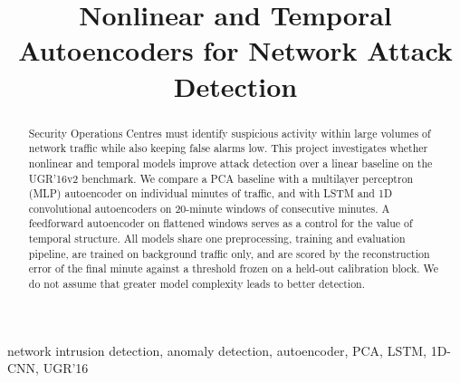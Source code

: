 \documentclass[conference]{IEEEtran}
\begin{document}
\title{Nonlinear and Temporal Autoencoders for Network Attack Detection}

\author{
\and
{}
\and
{}
\and
{}
}

\maketitle

\begin{abstract}
Security Operations Centres must identify suspicious activity within large volumes of network traffic while also keeping false alarms low. This project investigates whether nonlinear and temporal models improve attack detection over a linear baseline on the UGR'16v2 benchmark. We compare a PCA baseline with a multilayer perceptron (MLP) autoencoder on individual minutes of traffic, and with LSTM and 1D convolutional autoencoders on 20-minute windows of consecutive minutes. A feedforward autoencoder on flattened windows serves as a control for the value of temporal structure. All models share one preprocessing, training and evaluation pipeline, are trained on background traffic only, and are scored by the reconstruction error of the final minute against a threshold frozen on a held-out calibration block. We do not assume that greater model complexity leads to better detection.
\end{abstract}

\begin{IEEEkeywords}
network intrusion detection, anomaly detection, autoencoder, PCA, LSTM, 1D-CNN, UGR'16
\end{IEEEkeywords}
\end{document}
